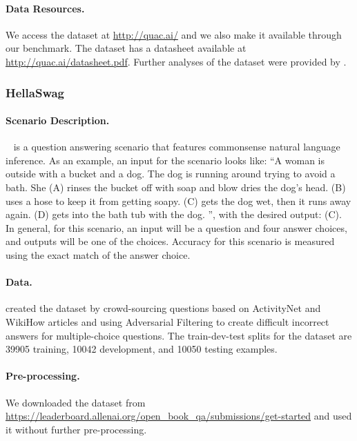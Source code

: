\paragraph{Data Resources.}
We access the dataset at \url{http://quac.ai/} and we also make it available through our benchmark.
The dataset has a datasheet available at \url{http://quac.ai/datasheet.pdf}.
Further analyses of the dataset were provided by \citet{yatskar2019qualitative}.

\subsubsection{HellaSwag}

\paragraph{Scenario Description.}
\hellaswag~\citep{zellers2019hellaswag} is a question answering scenario that features commonsense natural language inference.
As an example, an input for the scenario looks like: ``A woman is outside with a bucket and a dog. The dog is running around trying to avoid a bath. She
(A) rinses the bucket off with soap and blow dries the dog's head.
(B) uses a hose to keep it from getting soapy.
(C) gets the dog wet, then it runs away again.
(D) gets into the bath tub with the dog.
'', with the desired output: (C).
In general, for this scenario, an input will be a question and four answer choices, and outputs will be one of the choices.
Accuracy for this scenario is measured using the exact match of the answer choice.

\paragraph{Data.}
\citet{zellers2019hellaswag} created the dataset by
crowd-sourcing questions based on ActivityNet and WikiHow articles and using Adversarial Filtering to create difficult incorrect answers for multiple-choice questions.
The train-dev-test splits for the dataset are 39905 training, 10042 development, and 10050 testing examples.


\paragraph{Pre-processing.}
We downloaded the dataset from \url{https://leaderboard.allenai.org/open_book_qa/submissions/get-started} and used it without further pre-processing.

